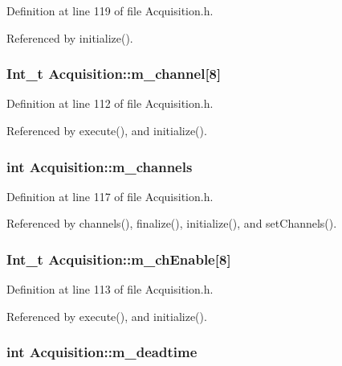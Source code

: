 Definition at line 119 of file Acquisition.h.

Referenced by initialize().\hypertarget{classAcquisition_a1123502b520aec97ee8a71039abaa3fb}{
\subsubsection[{m\_\-channel}]{\setlength{\rightskip}{0pt plus 5cm}Int\_\-t {\bf Acquisition::m\_\-channel}\mbox{[}8\mbox{]}}}
\label{classAcquisition_a1123502b520aec97ee8a71039abaa3fb}


Definition at line 112 of file Acquisition.h.

Referenced by execute(), and initialize().\hypertarget{classAcquisition_aedc8b29f322ef00540797fbd0d5112d1}{
\subsubsection[{m\_\-channels}]{\setlength{\rightskip}{0pt plus 5cm}int {\bf Acquisition::m\_\-channels}}}
\label{classAcquisition_aedc8b29f322ef00540797fbd0d5112d1}


Definition at line 117 of file Acquisition.h.

Referenced by channels(), finalize(), initialize(), and setChannels().\hypertarget{classAcquisition_ad323c9602565eec8e41f573d441745e2}{
\subsubsection[{m\_\-chEnable}]{\setlength{\rightskip}{0pt plus 5cm}Int\_\-t {\bf Acquisition::m\_\-chEnable}\mbox{[}8\mbox{]}}}
\label{classAcquisition_ad323c9602565eec8e41f573d441745e2}


Definition at line 113 of file Acquisition.h.

Referenced by execute(), and initialize().\hypertarget{classAcquisition_a5f7fe20506e7d860ed61935255adfe17}{
\subsubsection[{m\_\-deadtime}]{\setlength{\rightskip}{0pt plus 5cm}int {\bf Acquisition::m\_\-deadtime}}}
\label{classAcquisition_a5f7fe20506e7d860ed61935255adfe17}


